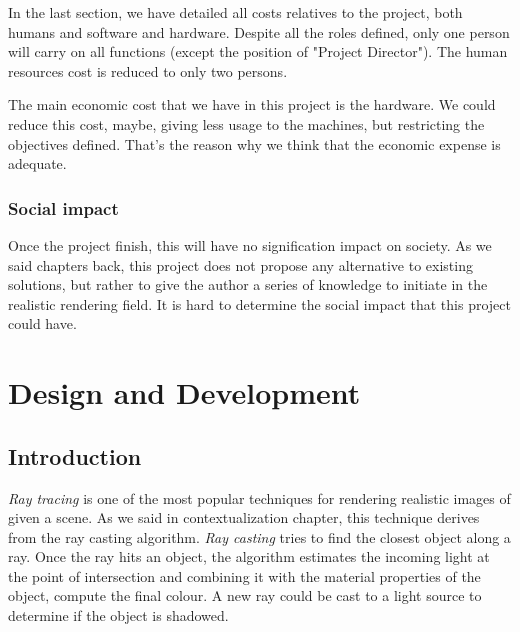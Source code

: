 \documentclass[titlepage,12pt]{report}
\begin{document}
In the last section, we have detailed all costs relatives to the project, both humans and software and hardware. Despite all the roles defined, only one person will carry on all functions (except the position of "Project Director"). The human resources cost is reduced to only two persons.

The main economic cost that we have in this project is the hardware. We could reduce this cost, maybe, giving less usage to the machines, but restricting the objectives defined. That's the reason why we think that the economic expense is adequate.

\subsection{Social impact}

Once the project finish, this will have no signification impact on society. As we said chapters back, this project does not propose any alternative to existing solutions, but rather to give the author a series of knowledge to initiate in the realistic rendering field. It is hard to determine the social impact that this project could have.

\chapter{Design and Development}

\section{Introduction}

\textit{Ray tracing} is one of the most popular techniques for rendering realistic images of given a scene. As we said in contextualization chapter, this technique derives from the ray casting algorithm. \textit{Ray casting} tries to find the closest object along a ray. Once the ray hits an object, the algorithm estimates the incoming light at the point of intersection and combining it with the material properties of the object, compute the final colour. A new ray could be cast to a light source to determine if the object is shadowed.
\end{document}
